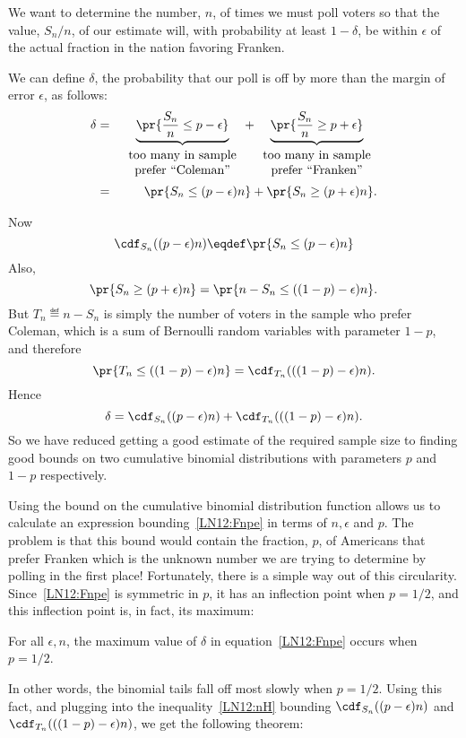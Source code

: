 We want to determine the number, $n$, of times we must poll voters so that
the value, $S_n/n$, of our estimate will, with probability at least
$1 -\delta$, be within $\epsilon$ of the actual fraction in the nation
favoring Franken.

We can define $\delta$, the probability that our poll is off by more
than the margin of error $\epsilon$, as follows:
\begin{eqnarray*}
\delta  & = &
        \underbrace{\pr{\frac{S_n}{n} \leq p - \epsilon}}_{
\begin{array}{c}
\mbox{too many in sample} \\
\mbox{prefer ``Coleman''}
\end{array}}
        + \underbrace{\pr{\frac{S_n}{n} \geq p + \epsilon}}_{
\begin{array}{c}
\mbox{too many in sample} \\
\mbox{prefer ``Franken''}
\end{array}} \\
        & = & \pr{S_n \leq (p - \epsilon) n} + \pr{S_n \geq (p + \epsilon) n}.
\end{eqnarray*}

Now
\[
\cdf_{S_n}((p-\epsilon)n) \eqdef \pr{S_n \leq (p - \epsilon) n}
\]
Also,
\[
\pr{S_n \geq (p + \epsilon) n} = \pr{n- S_n \leq ((1-p) - \epsilon)n}.
\]
But $T_n \eqdef n - S_n$ is simply the number of voters in the sample who prefer
Coleman, which is a sum of Bernoulli random variables
with parameter $1-p$, and therefore
\[
\pr{T_n \leq ((1-p) - \epsilon)n} = \cdf_{T_n}(((1-p) - \epsilon)n).
\]
Hence
\begin{equation}\label{LN12:Fnpe}
\delta = \cdf_{S_n}((p - \epsilon) n) + \cdf_{T_n}(((1-p) - \epsilon) n).
\end{equation}
So we have reduced getting a good estimate of the required sample size to
finding good bounds on two cumulative binomial distributions
with parameters $p$ and $1-p$ respectively.

Using the bound on the cumulative binomial distribution function allows us
to calculate an expression bounding~\eqref{LN12:Fnpe} in terms of $n, \epsilon$
and $p$.  The problem is that this bound would contain the fraction, $p$,
of Americans that prefer Franken which is the unknown number we are trying
to determine by polling in the first place!  Fortunately, there is a
simple way out of this circularity.  Since~\eqref{LN12:Fnpe} is symmetric in
$p$, it has an inflection point when $p=1/2$, and this inflection point
is, in fact, its maximum:
\begin{fact*}
For all $\epsilon,n$, the maximum value of $\delta$ in
equation~\eqref{LN12:Fnpe} occurs when $p = 1/2$.
\end{fact*}
In other words, the binomial tails fall off most slowly when $p=1/2$.
Using this fact, and plugging into the inequality~\eqref{LN12:nH} bounding
$\cdf_{S_n}((p - \epsilon) n)$ and $\cdf_{T_n}(((1-p) - \epsilon) n)$, we
get the following theorem:

